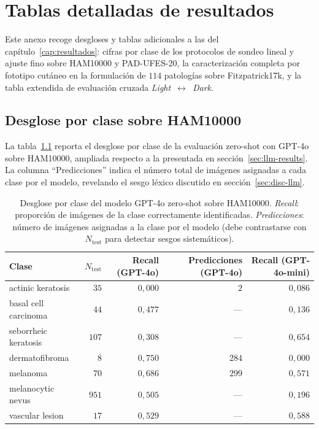 
\chapter{Tablas detalladas de resultados}
\label{anexo:tablas}
\label{cap:anexob}

Este anexo recoge desgloses y tablas adicionales a las del
capítulo~\ref{cap:resultados}: cifras por clase de los protocolos
de sondeo lineal y ajuste fino sobre HAM10000 y PAD-UFES-20, la
caracterización completa por fototipo cutáneo en la formulación de
$114$ patologías sobre Fitzpatrick17k, y la tabla extendida
de evaluación cruzada \emph{Light}~$\leftrightarrow$~\emph{Dark}.

\section{Desglose por clase sobre HAM10000}
\label{sec:anexob-ham}

La tabla~\ref{tab:anexob-perclass-gpt4o} reporta el desglose por
clase de la evaluación zero-shot con GPT-4o sobre HAM10000,
ampliada respecto a la presentada en
sección~\ref{sec:llm-results}. La columna ``Predicciones'' indica el
número total de imágenes asignadas a cada clase por el modelo,
revelando el sesgo léxico discutido en sección~\ref{sec:disc-llm}.

\begin{table}[H]
\centering
\footnotesize
\setlength{\tabcolsep}{4pt}
\renewcommand{\arraystretch}{0.95}
\caption{Desglose por clase del modelo GPT-4o zero-shot sobre
HAM10000. \emph{Recall}: proporción de imágenes de la clase
correctamente identificadas. \emph{Predicciones}: número de
imágenes asignadas a la clase por el modelo (debe contrastarse
con $N_{\mathrm{test}}$ para detectar sesgos sistemáticos).}
\label{tab:anexob-perclass-gpt4o}
\begin{tabular}{lrrrr}
\hline
Clase                       & $N_{\mathrm{test}}$ & Recall (GPT-4o) & Predicciones (GPT-4o) & Recall (GPT-4o-mini) \\
\hline
actinic keratosis           & $35$    & $0{,}000$ & $2$    & $0{,}086$ \\
basal cell carcinoma        & $44$    & $0{,}477$ & ---    & $0{,}136$ \\
seborrheic keratosis        & $107$   & $0{,}308$ & ---    & $0{,}654$ \\
dermatofibroma              & $8$     & $0{,}750$ & $284$  & $0{,}000$ \\
melanoma                    & $70$    & $0{,}686$ & $299$  & $0{,}571$ \\
melanocytic nevus           & $951$   & $0{,}505$ & ---    & $0{,}196$ \\
vascular lesion             & $17$    & $0{,}529$ & ---    & $0{,}588$ \\
\hline
\end{tabular}
\end{table}

